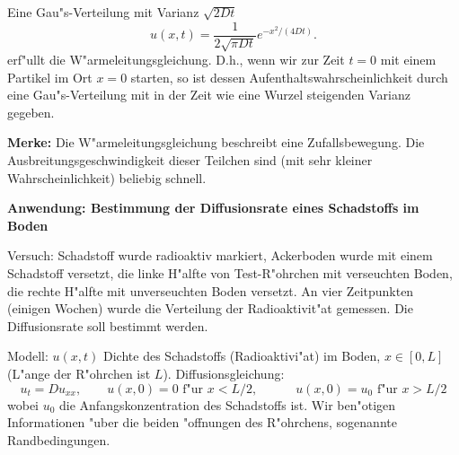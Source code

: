 \begin{sbem} Eine Gau"s-Verteilung mit Varianz $\sqrt{2 D t}$ 
$$ u(x,t) = \frac 1 {2\sqrt{\pi D t}}e^{-x^2/(4Dt)}.$$
erf"ullt die W"armeleitungsgleichung. D.h., wenn wir zur Zeit $t=0$ mit einem Partikel 
im Ort $x=0$ starten, so ist dessen Aufenthaltswahrscheinlichkeit 
durch eine Gau"s-Verteilung mit in der Zeit wie eine Wurzel steigenden 
Varianz gegeben. 
\end{sbem}


{\bf Merke: } Die W"armeleitungsgleichung beschreibt eine Zufallsbewegung. 
Die Ausbreitungsgeschwindigkeit dieser Teilchen sind (mit sehr kleiner Wahrscheinlichkeit)
beliebig schnell.

\par\bigskip
{\bf Anwendung: Bestimmung der Diffusionsrate eines Schadstoffs im Boden}\par\medskip\label{difMod}
Versuch: Schadstoff wurde radioaktiv markiert, 
Ackerboden wurde mit einem Schadstoff versetzt, die linke H"alfte von 
Test-R"ohrchen mit verseuchten Boden, die rechte H"alfte mit unverseuchten 
Boden versetzt. An vier Zeitpunkten (einigen Wochen) wurde die Verteilung der
Radioaktivit"at gemessen. Die Diffusionsrate soll bestimmt werden.\par\medskip
Modell: $u(x,t)$ Dichte des Schadstoffs (Radioaktivi"at) im Boden, $x\in [0,L]$ 
(L"ange der R"ohrchen ist $L$). Diffusionsgleichung:
$$u_t = D u_{xx},
\qquad u(x,0) = 0 \mbox{ f"ur } x<L/2,\quad
\qquad u(x,0) = u_0 \mbox{ f"ur } x>L/2$$
wobei $u_0$ die Anfangskonzentration des Schadstoffs ist. Wir ben"otigen 
 Informationen "uber die beiden "offnungen des R"ohrchens, sogenannte 
 Randbedingungen.

\par\medskip


